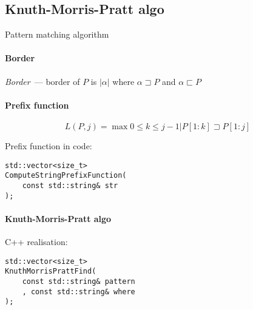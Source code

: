 \documentclass{article}
\begin{document}
\subsection{Knuth-Morris-Pratt algo}
Pattern matching algorithm

\paragraph{Border}
\textit{Border}~---
    border of $P$ is
    $ |\alpha| $ where
    $\alpha \sqsupset P$ and $\alpha \sqsubset P$

\paragraph{Prefix function}
$$
    L(P, j) =
        \max{0 \leq k \leq j - 1}
        | P[1:k] \sqsupset P[1:j]
$$

Prefix function in code:
\begin{lstlisting}
std::vector<size_t>
ComputeStringPrefixFunction(
    const std::string& str
);
\end{lstlisting}

\paragraph{Knuth-Morris-Pratt algo}
C++ realisation:
\begin{lstlisting}
std::vector<size_t>
KnuthMorrisPrattFind(
    const std::string& pattern
    , const std::string& where
);
\end{lstlisting}
\end{document}
